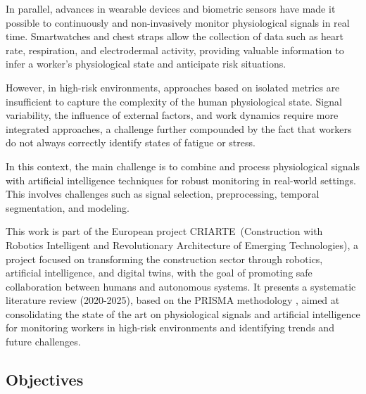 \documentclass[runningheads]{llncs}
\newcommand{\criarteAcronym}{CRIARTE}
\newcommand{\criarteProjectLong}{\criarteAcronym\ (Construction with Robotics Intelligent and Revolutionary Architecture of Emerging Technologies)}
\begin{document}
In parallel, advances in wearable devices and biometric sensors have made it possible to continuously and non-invasively monitor physiological signals in real time. Smartwatches and chest straps allow the collection of data such as heart rate, respiration, and electrodermal activity, providing valuable information to infer a worker's physiological state and anticipate risk situations.

However, in high-risk environments, approaches based on isolated metrics are insufficient to capture the complexity of the human physiological state. Signal variability, the influence of external factors, and work dynamics require more integrated approaches, a challenge further compounded by the fact that workers do not always correctly identify states of fatigue or stress.

In this context, the main challenge is to combine and process physiological signals with artificial intelligence techniques for robust monitoring in real-world settings. This involves challenges such as signal selection, preprocessing, temporal segmentation, and modeling.

This work is part of the European project \criarteProjectLong, a project focused on transforming the construction sector through robotics, artificial intelligence, and digital twins, with the goal of promoting safe collaboration between humans and autonomous systems. It presents a systematic literature review (2020-2025), based on the PRISMA methodology \cite{page2021prisma}, aimed at consolidating the state of the art on physiological signals and artificial intelligence for monitoring workers in high-risk environments and identifying trends and future challenges.
\subsection{Objectives}
\end{document}
